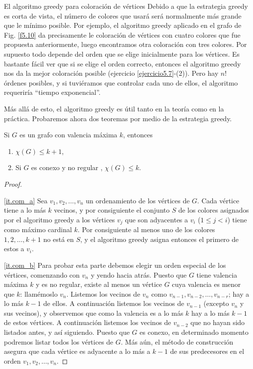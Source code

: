 \begin{section}{El algoritmo greedy para coloración de vértices}
Debido a que la estrategia greedy es corta de vista, el número de colores que usará será normalmente más grande que le mínimo posible. Por ejemplo, el algoritmo greedy aplicado en el grafo de Fig. \ref{f5.10} da precisamente le coloración de vértices con cuatro colores que fue propuesta anteriormente, luego encontramos
otra coloración con tres colores. Por supuesto todo depende del orden que se elige inicialmente para los vértices. Es bastante fácil ver que si se elige el orden correcto, entonces el algoritmo greedy nos da la mejor coloración posible (ejercicio \ref{ejercicio5.7}-(2)). Pero hay $n!$ órdenes posibles, y si tuviéramos que controlar cada uno de ellos, el algoritmo requeriría ``tiempo exponencial''.

Más allá de esto, el algoritmo greedy es útil tanto en la teoría como en la práctica. Probaremos ahora dos teoremas por medio de la estrategia greedy.

\begin{teorema}\label{t5.7.1} Si $G$ es un grafo con valencia máxima
$k$, entonces
\begin{enumerate}[label=\textit{\alph*)}]
\item\label{it.com_a}  $\chi(G)\le k+1$,
\item\label{it.com_b} Si $G$ es conexo y no regular , $\chi(G) \le k$.
\end{enumerate}
\end{teorema}
\begin{proof}
    
    \

\ref{it.com_a} Sea $v_1,v_2,\ldots,v_n$ un ordenamiento de los vértices de $G$. Cada vértice tiene a lo más $k$ vecinos, y por consiguiente el conjunto $S$ de los colores asignados por el algoritmo greedy a los vértices $v_j$ que son adyacentes a $v_i$ ($1\le j <i$) tiene como máximo cardinal $k$. Por consiguiente al
menos uno de los colores $1,2,\dots,k+1$ no está en $S$, y el algoritmo greedy asigna entonces el primero de estos a $v_i$.

\ref{it.com_b} Para probar esta parte debemos elegir un orden especial de los vértices, comenzando con $v_n$ y yendo hacia atrás. Puesto que $G$ tiene valencia máxima $k$ y es no regular, existe al menos un vértice $G$ cuya valencia es menor que $k$: llamémoslo $v_n$. Listemos los vecinos de $v_n$ como
$v_{n-1},v_{n-2},\ldots,v_{n-r}$; hay a lo más $k-1$ de ellos. A continuación listemos los vecinos de $v_{n-1}$ (excepto $v_n$ y sus vecinos), y observemos que como la valencia es a lo más $k$ hay a lo más $k-1$ de estos vértices. A continuación listemos los vecinos de $v_{n-2}$ que no hayan sido listados antes, y así
siguiendo. Puesto que $G$ es conexo, en determinado momento podremos listar todos los vértices de $G$. Más aún, el método de construcción asegura que cada vértice es adyacente a lo más a $k-1$ de sus predecesores en el orden $v_1,v_2,\ldots,v_n$.


\end{proof}
\end{section}
